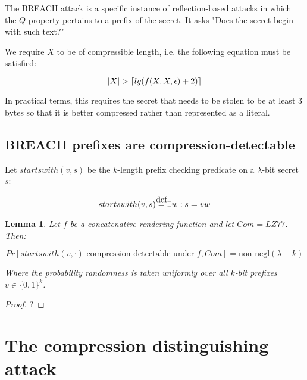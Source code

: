 \documentclass{article}
\DeclarePairedDelimiter{\ceil}{\lceil}{\rceil}
\newtheorem*{lemma}{Lemma}
\newcommand\defeq{\stackrel{\mathclap{\normalfont\mbox{def}}}{=}}
\begin{document}
The BREACH attack is a specific instance of reflection-based attacks in which
the $Q$ property pertains to a prefix of the secret. It asks "Does the secret
begin with such text?"

We require $X$ to be of compressible length,
i.e. the following equation must be satisfied:

\begin{equation*}
    |X| > \ceil{lg(f(X, X, \epsilon) + 2)}
\end{equation*}

In practical terms, this requires the secret that needs to be stolen
to be at least 3 bytes so that it is better compressed rather than
represented as a literal.

\subsection{BREACH prefixes are compression-detectable}

Let $startswith(v, s)$ be the $k$-length prefix checking predicate on a $\lambda$-bit
secret $s$:

\begin{equation*}
    startswith(v, s) \defeq \exists w: s = v w
\end{equation*}

\begin{lemma}

Let $f$ be a concatenative rendering function and let $Com = LZ77$. Then:

\begin{equation}
Pr[startswith(v, \cdot) \textrm{ compression-detectable under } f, Com] = \text{non-negl}(\lambda - k)
\end{equation}

Where the probability randomness is taken uniformly over all $k$-bit prefixes $v \in \{0, 1\}^k$.

\end{lemma}

\begin{proof}
?
\end{proof}

\section{The compression distinguishing attack}
\end{document}
